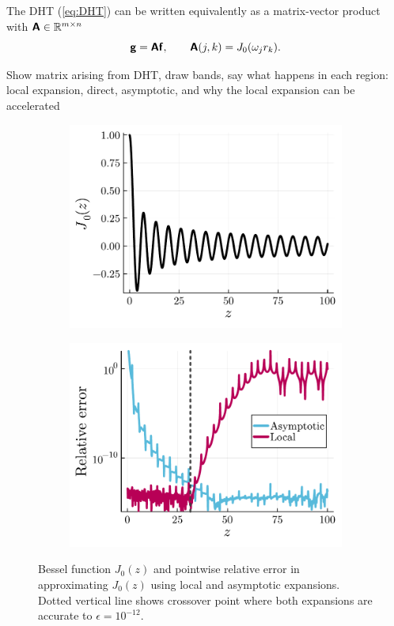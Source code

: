 
The DHT (\ref{eq:DHT}) can be written equivalently as a matrix-vector product with $\bm{\mathsf{A}} \in \mathbb{R}^{m \times n}$
\begin{equation}
    \bm{\mathsf{g}} = \bm{\mathsf{A}}\bm{\mathsf{f}}, \qquad \bm{\mathsf{A}}(j,k) = J_0(\omega_j r_k).
\end{equation}


Show matrix arising from DHT, draw bands, say what happens in each region: local
expansion, direct, asymptotic, and why the local expansion can be accelerated

\begin{figure}
  \centering
  \begin{subfigure}[b]{0.45\textwidth}
    \includegraphics[width=\textwidth]{./figures/bessel_function.pdf}
  \end{subfigure}
  \begin{subfigure}[b]{0.45\textwidth}
    \includegraphics[width=\textwidth]{./figures/pointwise_errors.pdf}
  \end{subfigure}
  \caption{Bessel function $J_0(z)$ and pointwise relative error in approximating $J_0(z)$ using local and asymptotic expansions. Dotted vertical line shows crossover point where both expansions are accurate to $\epsilon = 10^{-12}$.}
\end{figure}

